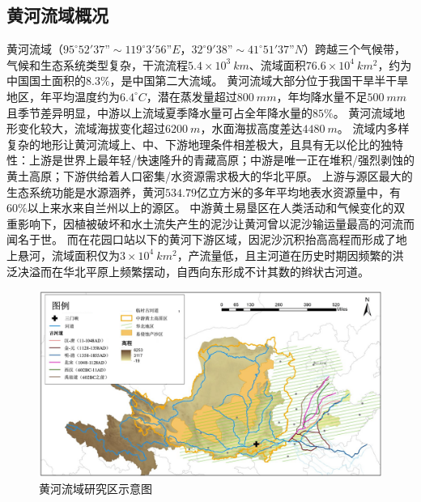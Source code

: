 \subsection{黄河流域概况}

黄河流域（$95^{\circ}52'37” \sim 119^{\circ}3'56”E$，$32^{\circ}9'38” \sim 41^{\circ}51'37”N$）跨越三个气候带，气候和生态系统类型复杂，干流流程$5.4 \times 10^3~km$、流域面积$76.6 \times 10^4~km^2$，约为中国国土面积的$8.3\%$，是中国第二大流域。
黄河流域大部分位于我国干旱半干旱地区，年平均温度约为$6.4 ^{\circ}C$，潜在蒸发量超过$800~mm$，年均降水量不足$500~mm$且季节差异明显，中游以上流域夏季降水量可占全年降水量的$85\%$\cite{maxuening2012,wang2007}。
黄河流域地形变化较大，流域海拔变化超过$6200~m$，水面海拔高度差达$4480~m$。
流域内多样复杂的地形让黄河流域上、中、下游地理条件相差极大，且具有无以伦比的独特性：上游是世界上最年轻/快速隆升的青藏高原；中游是唯一正在堆积/强烈剥蚀的黄土高原；下游供给着人口密集/水资源需求极大的华北平原。
上游与源区最大的生态系统功能是水源涵养，黄河$534.79$亿立方米的多年平均地表水资源量中，有$60\%$以上来水来自兰州以上的源区\cite{huchunhong2018}。
中游黄土易垦区在人类活动和气候变化的双重影响下，因植被破坏和水土流失产生的泥沙让黄河曾以泥沙输运量最高的河流而闻名于世\cite{best2019}。
而在花园口站以下的黄河下游区域，因泥沙沉积抬高高程而形成了地上悬河，流域面积仅为$3 \times 10^4~km^2$，产流量低，且主河道在历史时期因频繁的洪泛决溢而在华北平原上频繁摆动，自西向东形成不计其数的辫状古河道。


\begin{figure}[!ht] %
    \includegraphics[width=\textwidth]{img/ch1/ch1_study_area.png}
    \caption{黄河流域研究区示意图}\label{ch1:fig:study_area}
\end{figure}

